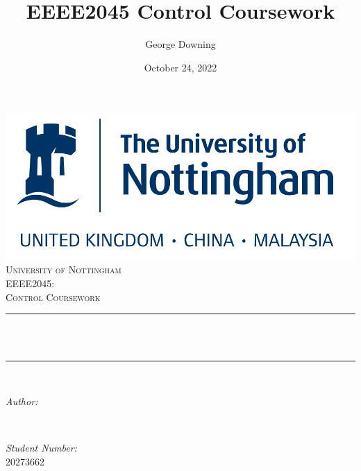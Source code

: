 \documentclass[12pt]{article}
\title{EEEE2045 Control Coursework}								%
\author{George Downing}								                        %
\date{October 24, 2022}											            %
\makeatletter
\let\thetitle\@title
\let\theauthor\@author
\let\thedate\@date
\makeatother
\begin{document}

\begin{titlepage}
    \centering
    \vspace*{0.5 cm}
    \includegraphics[scale = 0.4]{uon.png}\\[1.0 cm]	%
    \textsc{\LARGE University of Nottingham}\\[2.0 cm]	%
    \textsc{\Large EEEE2045:}\\[0.5 cm]				%
    \textsc{\large Control Coursework}\\[0.5 cm]				%
    \rule{\linewidth}{0.2 mm} \\[0.4 cm]
    { \huge \bfseries \thetitle}\\
    \rule{\linewidth}{0.2 mm} \\[1.5 cm]

    \begin{minipage}{0.4\textwidth}
        \begin{flushleft} \large
            \emph{Author:}\\
            \theauthor
        \end{flushleft}
    \end{minipage}~
    \begin{minipage}{0.4\textwidth}
        \begin{flushright} \large
            \emph{Student Number:} \\
            20273662									%
        \end{flushright}
    \end{minipage}\\[2 cm]

    {\large \thedate}\\[2 cm]

    \vfill

\end{titlepage}
\end{document}
